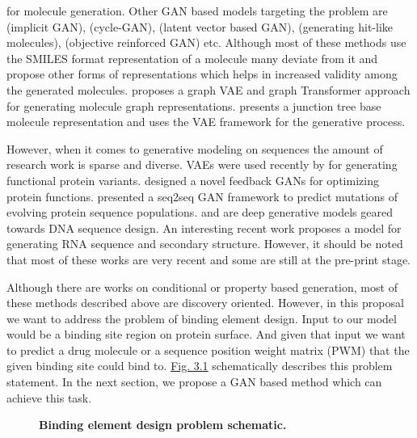 for molecule generation. Other GAN based models
targeting the problem are \citep{de2018molgan} (implicit GAN), \citep{maziarka2020mol} (cycle-GAN), \citet{prykhodko2019novo} (latent vector based GAN), 
\citet{mendez2020novo} (generating hit-like molecules), \citet{guimaraes2017objective} (objective
reinforced GAN) etc. Although most of these methods use the SMILES format representation of a
molecule many deviate from it and propose other forms of representations which helps in increased
validity among the generated molecules. \citet{mitton2021graph} proposes a graph VAE and graph
Transformer \citep{vaswani2017attention} approach for generating molecule graph representations.
\citet{jin2018junction} presents a junction tree base molecule representation and uses the VAE
framework for the generative process.
\par
However, when it comes to generative modeling on sequences the amount of research work is sparse and
diverse. VAEs were used recently by \citet{hawkins2021generating} for generating functional protein
variants. \citet{gupta2018feedback} designed a novel feedback GANs for optimizing protein functions.
\citet{berman2020mutagan} presented a seq2seq GAN framework to predict mutations of evolving protein
sequence populations. \citet{linder2020generative} and \citet{killoran2017generating} are deep
generative models geared towards DNA sequence design. An interesting recent work
\citet{yan2021neural} proposes a model for generating RNA sequence and secondary structure. However,
it should be noted that most of these works are very recent and some are still at the pre-print
stage. 
\par
Although there are works on conditional or property based generation, most of these methods
described above are discovery oriented. However, in this proposal we want to address the problem of
binding element design. Input to our model would be a binding site region on protein surface. And
given that input we want to predict a drug molecule or a sequence position weight matrix (PWM) that
the given binding site could bind to. \hyperref[fig:design_problem]{Fig. 3.1} schematically
describes this problem statement. In the next section, we propose a GAN based method which can
achieve this task.
\begin{center}\begin{figure}
        \caption[Binding element design problem schematic]{\textbf{Binding element design problem
        schematic.}}
        \label{fig:design_problem} \end{figure} \end{center}

